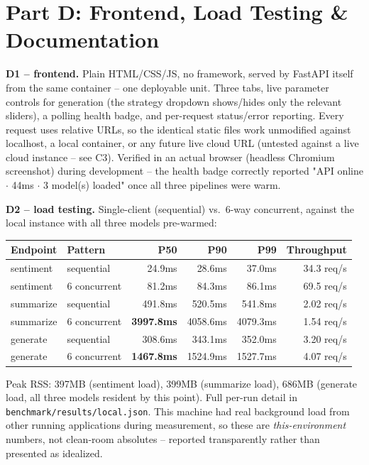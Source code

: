 \documentclass[11pt,a4paper]{article}
\begin{document}
\section*{Part D: Frontend, Load Testing \& Documentation}

\textbf{D1 -- frontend.} Plain HTML/CSS/JS, no framework, served by FastAPI itself from the
same container -- one deployable unit. Three tabs, live parameter controls for generation
(the strategy dropdown shows/hides only the relevant sliders), a polling health badge, and
per-request status/error reporting. Every request uses relative URLs, so the identical static
files work unmodified against localhost, a local container, or any future live cloud URL
(untested against a live cloud instance -- see C3). Verified
in an actual browser (headless Chromium screenshot) during development -- the health badge
correctly reported "API online $\cdot$ 44ms $\cdot$ 3 model(s) loaded" once all three
pipelines were warm.

\textbf{D2 -- load testing.} Single-client (sequential) vs.\ 6-way concurrent, against the
local instance with all three models pre-warmed:

\begin{table}[H]
\centering
\small
\begin{tabular}{llrrrr}
\toprule
\textbf{Endpoint} & \textbf{Pattern} & \textbf{P50} & \textbf{P90} & \textbf{P99} & \textbf{Throughput} \\
\midrule
sentiment & sequential & 24.9ms & 28.6ms & 37.0ms & 34.3 req/s \\
sentiment & 6 concurrent & 81.2ms & 84.3ms & 86.1ms & 69.5 req/s \\
summarize & sequential & 491.8ms & 520.5ms & 541.8ms & 2.02 req/s \\
summarize & 6 concurrent & \textbf{3997.8ms} & 4058.6ms & 4079.3ms & 1.54 req/s \\
generate & sequential & 308.6ms & 343.1ms & 352.0ms & 3.20 req/s \\
generate & 6 concurrent & \textbf{1467.8ms} & 1524.9ms & 1527.7ms & 4.07 req/s \\
\bottomrule
\end{tabular}
\end{table}

Peak RSS: 397MB (sentiment load), 399MB (summarize load), 686MB (generate load, all three
models resident by this point). Full per-run detail in \texttt{benchmark/results/local.json}.
This machine had real background load from other running applications during measurement, so
these are \emph{this-environment} numbers, not clean-room absolutes -- reported transparently
rather than presented as idealized.
\end{document}
